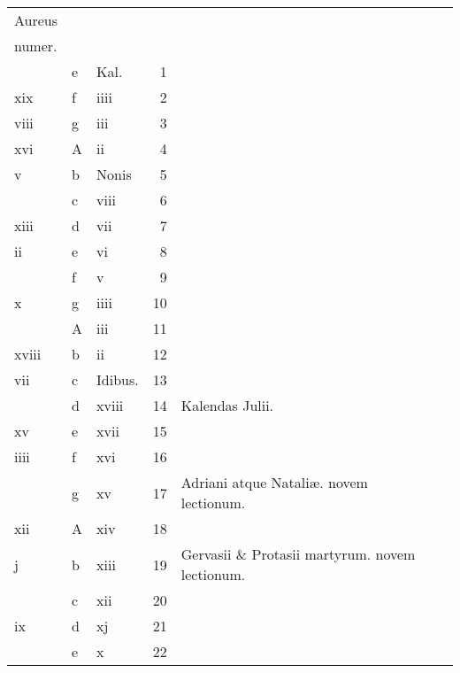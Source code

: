 \documentclass[openany]{book}
\begin{document}
\begin{center}
\begin{tabular}{l | l | l | r | l r}
\color{Red}Aureus & & & & \color{Red} \\
\color{Red}numer. & & & & \color{Red} \\
\color{Red}  & e & \color{Red} Kal. & 1 & & \color{Red} \\
\color{Red} xix & f & \color{Red} iiii & 2 & & \color{Red} \\
\color{Red} viii & g & \color{Red} iii & 3 & & \color{Red} \\
\color{Red} xvi & \color{Red} A & \color{Red} ii & 4 & & \color{Red} \\
\color{Red} v & b & Nonis & 5 & & \color{Red} \\
\color{Red}  & c & \color{Red} viii & 6 & & \color{Red} \\
\color{Red} xiii & d & \color{Red} vii & 7 & & \color{Red} \\
\color{Red} ii & e & \color{Red} vi & 8 & & \color{Red} \\
\color{Red}  & f & \color{Red} v & 9 & & \color{Red} \\
\color{Red} x & g & \color{Red} iiii & 10 & & \color{Red} \\
\color{Red}  & \color{Red} A & \color{Red} iii & 11 & & \color{Red} \\
\color{Red} xviii & b & \color{Red} ii & 12 & & \color{Red} \\
\color{Red} vii & c & Idibus. & 13 & & \color{Red} \\
\color{Red}  & d & \color{Red} xviii & 14 & \qquad \color{Red} Kalendas Julii. & \color{Red} \\
\color{Red} xv & e & \color{Red} xvii & 15 & & \color{Red} \\
\color{Red} iiii & f & \color{Red} xvi & 16 & & \color{Red} \\
\color{Red}  & g & \color{Red} xv & 17 & Adriani atque Natali\ae . \color{Red} novem lectionum. & \color{Red} \\
\color{Red} xii & \color{Red} A & \color{Red} xiv & 18 & & \color{Red} \\
\color{Red} j & b & \color{Red} xiii & 19 & Gervasii \& Protasii martyrum. \color{Red} novem lectionum. & \color{Red} \\
\color{Red}  & c & \color{Red} xii & 20 & & \color{Red} \\
\color{Red} ix & d & \color{Red} xj & 21 & & \color{Red} \\
\color{Red}  & e & \color{Red} x & 22 & & \color{Red} \\

\end{tabular}
\end{center}
\end{document}
